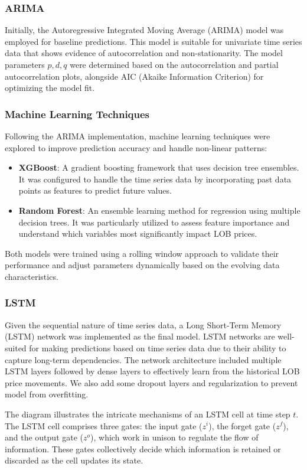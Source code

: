 \documentclass[conference]{IEEEtran}
\begin{document}
\subsubsection{ARIMA}
Initially, the Autoregressive Integrated Moving Average (ARIMA) model was employed for baseline predictions. This model is suitable for univariate time series data that shows evidence of autocorrelation and non-stationarity. The model parameters \(p, d, q\) were determined based on the autocorrelation and partial autocorrelation plots, alongside AIC (Akaike Information Criterion) for optimizing the model fit.

\subsubsection{Machine Learning Techniques}
Following the ARIMA implementation, machine learning techniques were explored to improve prediction accuracy and handle non-linear patterns:
\begin{itemize}
    \item \textbf{XGBoost}: A gradient boosting framework that uses decision tree ensembles. It was configured to handle the time series data by incorporating past data points as features to predict future values.
    \item \textbf{Random Forest}: An ensemble learning method for regression using multiple decision trees. It was particularly utilized to assess feature importance and understand which variables most significantly impact LOB prices.
\end{itemize}
Both models were trained using a rolling window approach to validate their performance and adjust parameters dynamically based on the evolving data characteristics.

\subsubsection{LSTM}
Given the sequential nature of time series data, a Long Short-Term Memory (LSTM) network was implemented as the final model. LSTM networks are well-suited for making predictions based on time series data due to their ability to capture long-term dependencies. The network architecture included multiple LSTM layers followed by dense layers to effectively learn from the historical LOB price movements. We also add some dropout layers and regularization to prevent model from overfitting.

The diagram illustrates the intricate mechanisms of an LSTM cell at time step \( t \). The LSTM cell comprises three gates: the input gate (\( z^i \)), the forget gate (\( z^f \)), and the output gate (\( z^o \)), which work in unison to regulate the flow of information. These gates collectively decide which information is retained or discarded as the cell updates its state.
\end{document}
